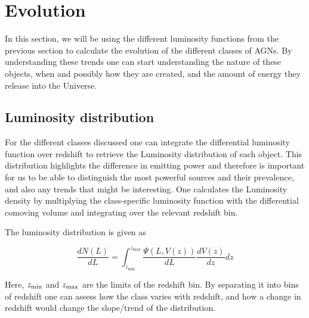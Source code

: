 \section{Evolution}
In this section, we will be using the different luminosity functions from the previous section to calculate the evolution of the different classes of AGNs. 
By understanding these trends one can start understanding the nature of these objects, when and \colorbox{BurntOrange}{possibly how} they are created, and the amount of energy they release into the Universe. 



 


\subsection{Luminosity distribution}
 
For the different classes discussed one can integrate the differential luminosity function over redshift to retrieve the Luminosity distribution of each 
object. This distribution highlights the difference in emitting power and therefore is important for us to be able to distinguish the most powerful 
sources and their prevalence, and also any trends that might be interesting. One calculates the Luminosity density by multiplying the class-specific luminosity
function with the differential comoving volume and integrating over the relevant redshift bin. 

The luminosity distribution is given as


\begin{equation}
    \frac{dN(L)}{dL} = \int_{z_{\text{min}}}^{z_{\text{max}}} \frac{\Psi(L, V(z))}{dL} \frac{dV(z)}{dz} dz
\end{equation}

Here, $z_{\rm min}$ and $z_{\rm max}$ are the limits of the redshift bin. By separating it into
bins of redshift one can assess how the class varies with redshift, and how a change in redshift would change the slope/trend of the distribution.  

